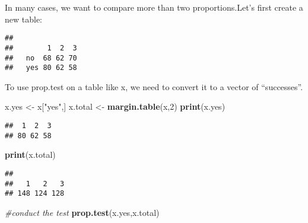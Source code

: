 \documentclass[]{book}
\newenvironment{Shaded}{\begin{snugshade}}{\end{snugshade}}
\newcommand{\KeywordTok}[1]{\textcolor[rgb]{0.13,0.29,0.53}{\textbf{#1}}}
\newcommand{\DataTypeTok}[1]{\textcolor[rgb]{0.13,0.29,0.53}{#1}}
\newcommand{\DecValTok}[1]{\textcolor[rgb]{0.00,0.00,0.81}{#1}}
\newcommand{\StringTok}[1]{\textcolor[rgb]{0.31,0.60,0.02}{#1}}
\newcommand{\CommentTok}[1]{\textcolor[rgb]{0.56,0.35,0.01}{\textit{#1}}}
\newcommand{\OperatorTok}[1]{\textcolor[rgb]{0.81,0.36,0.00}{\textbf{#1}}}
\newcommand{\NormalTok}[1]{#1}
\theoremstyle{definition}
\theoremstyle{definition}
\theoremstyle{definition}
\theoremstyle{remark}
\begin{document}
In many cases, we want to compare more than two proportions.Let's first
create a new table:

\begin{Shaded}
\end{Shaded}

\begin{verbatim}
##      
##        1  2  3
##   no  68 62 70
##   yes 80 62 58
\end{verbatim}

To use prop.test on a table like x, we need to convert it to a vector of
``successes''.

\begin{Shaded}
\begin{Highlighting}[]
\NormalTok{x.yes <-}\StringTok{ }\NormalTok{x[}\StringTok{"yes"}\NormalTok{,]}
\NormalTok{x.total <-}\StringTok{ }\KeywordTok{margin.table}\NormalTok{(x,}\DecValTok{2}\NormalTok{)}
\KeywordTok{print}\NormalTok{(x.yes)}
\end{Highlighting}
\end{Shaded}

\begin{verbatim}
##  1  2  3 
## 80 62 58
\end{verbatim}

\begin{Shaded}
\begin{Highlighting}[]
\KeywordTok{print}\NormalTok{(x.total)}
\end{Highlighting}
\end{Shaded}

\begin{verbatim}
## 
##   1   2   3 
## 148 124 128
\end{verbatim}

\begin{Shaded}
\begin{Highlighting}[]
\CommentTok{#conduct the test}
\KeywordTok{prop.test}\NormalTok{(x.yes,x.total)}
\end{Highlighting}
\end{Shaded}
\end{document}
